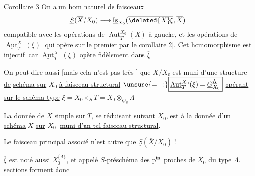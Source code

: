 \uline{Corollaire 3} On a un hom naturel de faisceaux
\[
\underline S(\overline X/X_0)\longrightarrow\underline{\operatorname{Is}}_{X_0}(\overline{\deleted{X}\xi},\overline X)
\]
compatible avec les opérations de $\underline{\operatorname{Aut}}_T^{X_0}(X)$ à gauche, et les opérations  de $\underline{\operatorname{Aut}}_T^{X_0}(\xi)$ [qui opère sur le premier  par le corollaire 2]. Cet homomorphisme est \uline{injectif} [car $\underline{\operatorname{Aut}}_T^{X_0}(\xi)$ opère fidèlement dans $\overline\xi$]

On peut dire aussi [mais cela n'est pas très ] que $\overline X/X_0$ \uline{est muni d'une structure de}  \uline{schéma sur} $X_0$ \uline{à faisceau structural} $\unsure{=|:}\boxed{\underline{\operatorname{Aut}}_T^{X_0}(\xi)=\underline G_{X_0}^{\underline{\Lambda}}}$ \uline{opérant sur le schéma-type} $\xi=X_0\times_S T=X_0\otimes_{\underline{O}_S}\underline{\Lambda}$

\uline{La donnée de} $X$ \uline{simple sur} $T$, se \uline{réduisant suivant} $X_0$, est  \uline{à la donnée d'un schéma} $\overline X$ \uline{sur} $X_0$, \uline{muni d'un tel faisceau structural}.

\uline{Le faisceau principal associé n'est autre que} $\underline S(\overline X/X_0)$ !

$\overline\xi$ est noté aussi $X_0^{\{\Lambda\}}$, et appelé  \uline{$S$-préschéma des p$^{\rm ts}$ proches} de $X_0$ \uline{du type} $\Lambda$.  sections  forment donc

